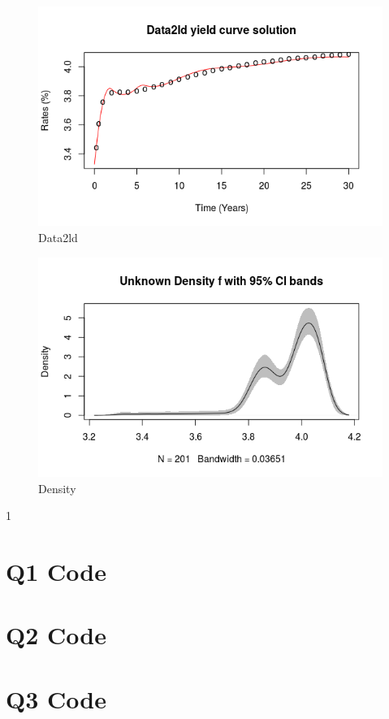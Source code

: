 \documentclass[a4paper]{article}
\begin{document}
\begin{appendix}
   \begin{figure}[H]
      \centering
      \includegraphics[width=1\textwidth]{data2ld.png}
      \caption{\label{fig:data2ld}Data2ld}
  \end{figure}

   \begin{figure}[H]
      \centering
      \includegraphics[width=1\textwidth]{density.png}
      \caption{\label{fig:density}Density}
  \end{figure}
  
1   \sloppy
    \newpage
    \section{Q1 Code}
   
    \newpage
    \section{Q2 Code}
   
    \newpage
    \section{Q3 Code}
   
\end{appendix}
\end{document}

